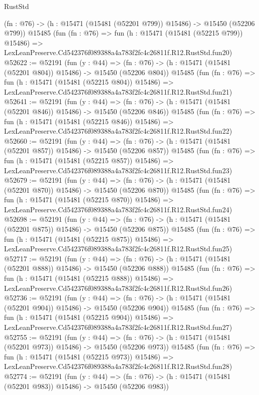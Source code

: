 \begin{lexlean}{RustStd}
\begin{coremodule}
    (fn : @76) -> (h : @15471 (@15481 (@52201 @799)) @15486) -> @15450 (@52206 @799))
    @15485
    (fun (fn : @76) =>
    fun (h : @15471 (@15481 (@52215 @799)) @15486) =>
    LexLeanPreserve.Cd542376f089388a4a783f2fc4c26811f.R12.RustStd.fun20)
@52622 := @52191
    (fun (y : @44) =>
    (fn : @76) -> (h : @15471 (@15481 (@52201 @804)) @15486) -> @15450 (@52206 @804))
    @15485
    (fun (fn : @76) =>
    fun (h : @15471 (@15481 (@52215 @804)) @15486) =>
    LexLeanPreserve.Cd542376f089388a4a783f2fc4c26811f.R12.RustStd.fun21)
@52641 := @52191
    (fun (y : @44) =>
    (fn : @76) -> (h : @15471 (@15481 (@52201 @846)) @15486) -> @15450 (@52206 @846))
    @15485
    (fun (fn : @76) =>
    fun (h : @15471 (@15481 (@52215 @846)) @15486) =>
    LexLeanPreserve.Cd542376f089388a4a783f2fc4c26811f.R12.RustStd.fun22)
@52660 := @52191
    (fun (y : @44) =>
    (fn : @76) -> (h : @15471 (@15481 (@52201 @857)) @15486) -> @15450 (@52206 @857))
    @15485
    (fun (fn : @76) =>
    fun (h : @15471 (@15481 (@52215 @857)) @15486) =>
    LexLeanPreserve.Cd542376f089388a4a783f2fc4c26811f.R12.RustStd.fun23)
@52679 := @52191
    (fun (y : @44) =>
    (fn : @76) -> (h : @15471 (@15481 (@52201 @870)) @15486) -> @15450 (@52206 @870))
    @15485
    (fun (fn : @76) =>
    fun (h : @15471 (@15481 (@52215 @870)) @15486) =>
    LexLeanPreserve.Cd542376f089388a4a783f2fc4c26811f.R12.RustStd.fun24)
@52698 := @52191
    (fun (y : @44) =>
    (fn : @76) -> (h : @15471 (@15481 (@52201 @875)) @15486) -> @15450 (@52206 @875))
    @15485
    (fun (fn : @76) =>
    fun (h : @15471 (@15481 (@52215 @875)) @15486) =>
    LexLeanPreserve.Cd542376f089388a4a783f2fc4c26811f.R12.RustStd.fun25)
@52717 := @52191
    (fun (y : @44) =>
    (fn : @76) -> (h : @15471 (@15481 (@52201 @888)) @15486) -> @15450 (@52206 @888))
    @15485
    (fun (fn : @76) =>
    fun (h : @15471 (@15481 (@52215 @888)) @15486) =>
    LexLeanPreserve.Cd542376f089388a4a783f2fc4c26811f.R12.RustStd.fun26)
@52736 := @52191
    (fun (y : @44) =>
    (fn : @76) -> (h : @15471 (@15481 (@52201 @904)) @15486) -> @15450 (@52206 @904))
    @15485
    (fun (fn : @76) =>
    fun (h : @15471 (@15481 (@52215 @904)) @15486) =>
    LexLeanPreserve.Cd542376f089388a4a783f2fc4c26811f.R12.RustStd.fun27)
@52755 := @52191
    (fun (y : @44) =>
    (fn : @76) -> (h : @15471 (@15481 (@52201 @973)) @15486) -> @15450 (@52206 @973))
    @15485
    (fun (fn : @76) =>
    fun (h : @15471 (@15481 (@52215 @973)) @15486) =>
    LexLeanPreserve.Cd542376f089388a4a783f2fc4c26811f.R12.RustStd.fun28)
@52774 := @52191
    (fun (y : @44) =>
    (fn : @76) -> (h : @15471 (@15481 (@52201 @983)) @15486) -> @15450 (@52206 @983))

\end{coremodule}
\end{lexlean}
